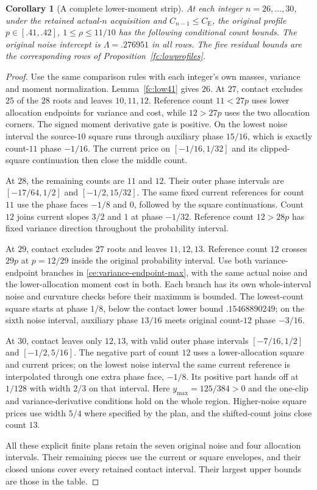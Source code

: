 \documentclass[aop,preprint]{imsart}
\newtheorem{corollary}[theorem]{Corollary}
\theoremstyle{definition}
\newcommand{\CE}{C_{\mathrm E}}
\numberwithin{equation}{section}
\begin{document}
\begin{corollary}[A complete lower-moment strip]\label{fc:p41-strip}\label{fc:n27-low41}\label{fc:n28-low41}\label{fc:n29-low41}\label{fc:n30-low41}
At each integer $n=26,\ldots,30$, under the retained actual-$n$ acquisition
and $C_{n-1}\le\CE$, the original profile $p\in[.41,.42]$,
$1\le\rho\le11/10$ has the following conditional count bounds.
The original noise intercept is $\Lambda=.276951$ in all rows.
The five residual bounds are the corresponding rows of
Proposition~\ref{fc:lowprofiles}.

\end{corollary}
\begin{proof}
Use the same comparison rules with each integer's own masses,
variance and moment normalization. Lemma~\ref{fc:low41} gives $26$.
At $27$, contact excludes
$25$ of the $28$ roots and leaves $10,11,12$.
Reference count $11<27p$ uses lower allocation
endpoints for variance and cost, while $12>27p$ uses the two
allocation corners. The signed moment derivative gate is positive.
On the lowest noise interval the source-$10$ square
runs through auxiliary phase $15/16$, which is exactly count-$11$
phase $-1/16$. The current price on $[-1/16,1/32]$ and its
clipped-square continuation then close the middle count.

At $28$, the remaining counts are $11$ and $12$.
Their outer phase intervals are $[-17/64,1/2]$ and $[-1/2,15/32]$.
The same fixed current
references for count $11$ use the phase faces $-1/8$ and $0$,
followed by the square continuations. Count $12$ joins current
slopes $3/2$ and $1$ at phase $-1/32$. Reference count $12>28p$
has fixed variance direction throughout the probability interval.

At $29$, contact excludes $27$ roots and leaves $11,12,13$.
Reference count $12$ crosses $29p$ at $p=12/29$ inside the
original probability interval. Use both variance-endpoint branches
in \eqref{ce:variance-endpoint-max}, with the same actual noise
and the lower-allocation moment cost in both. Each branch has
its own whole-interval noise and curvature checks before their
maximum is bounded. The lowest-count square starts at phase
$1/8$, below the contact lower bound $.15468890249$; on the
sixth noise interval, auxiliary phase $13/16$ meets original
count-$12$ phase $-3/16$.

At $30$, contact leaves only $12,13$, with valid outer phase
intervals $[-7/16,1/2]$ and $[-1/2,5/16]$. The negative part
of count $12$ uses a lower-allocation square and current prices;
on the lowest noise interval the same current reference is
interpolated through one extra phase face, $-1/8$.
Its positive part hands off at $1/128$ with width $2/3$ on
that interval. Here $y_{\max}=125/384>0$ and the one-clip
and variance-derivative conditions hold on the whole region.
Higher-noise square prices use width $5/4$ where specified
by the plan, and the shifted-count joins close count $13$.

All these explicit finite plans retain the seven original noise and
four allocation intervals. Their remaining pieces use the current
or square envelopes, and their closed unions cover every retained
contact interval. Their largest upper bounds are those in the table.
\end{proof}
\end{document}
